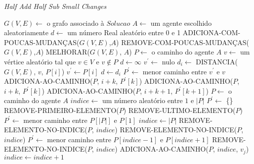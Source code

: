 \begin{algorithm}                   %
	\caption{\textit{Half Add Half Sub Small Changes}}          %
	\label{small_changes}                           %
	\begin{algorithmic}[1]                   %
		\newline
		\State $G(V,E) \gets $ o grafo associado à $Solucao$
		\State $A \gets $ um agente escolhido aleatoriamente
		\State $d \gets $ um número Real aleatório entre 0 e 1
			\State ADICIONA-COM-POUCAS-MUDANÇAS($G(V,E)$,$A$)
		\Else
			\State REMOVE-COM-POUCAS-MUDANÇAS($G(V,E)$,$A$)
		\EndIf
		\State MELHORAR($G(V,E)$, $A$)
		\EndProcedure
		\State $P \gets $ o caminho do agente $A$
		\State $v \gets $ um vértice aleatório tal que $v \in V$ e $v \notin P$
		\State $d \gets \infty$
		\State $v^{\prime} \gets $ nulo
			$d_{i} \gets $ DISTANCIA($G(V,E)$, $v$, $P[i]$)
				$v^{\prime} \gets P[i]$
				\State $d \gets d_{i}$
			\EndIf
		\EndFor
		\State $P^{\prime} \gets $ menor caminho entre $v^{\prime}$ e $v$
			ADICIONA-AO-CAMINHO($P$, $i + k$, $P^{\prime}[k]$)
			\State ADICIONA-AO-CAMINHO($P$, $i + k$, $P^{\prime}[k]$)
		\EndFor
		\State ADICIONA-AO-CAMINHO($P$, $i + k + 1$, $P^{\prime}[k + 1]$)
		\EndProcedure
		\State $P \gets $ o caminho do agente $A$
		\State $indice \gets $ um número aleatório entre $1$ e $|P|$
		\State $P^{\prime} \gets $ \{\}
			REMOVE-PRIMEIRO-ELEMENTO($P$)
			\State REMOVE-ULTIMO-ELEMENTO($P$)
			\State $P^{\prime} \gets $ menor caminho entre $P[|P|]$ e $P[1]$
			\State $indice \gets |P|$
			\State REMOVE-ELEMENTO-NO-INDICE($P$, $indice$)
			\State REMOVE-ELEMENTO-NO-INDICE($P$, $indice$)
		\Else
			$P^{\prime} \gets $ menor caminho entre $P[indice - 1]$ e $P[indice + 1]$
			\State REMOVE-ELEMENTO-NO-INDICE($P$, $indice$)
		\EndIf
			ADICIONA-AO-CAMINHO($P$, $indice$, $v_{j}$)
			\State $indice \gets indice + 1$
		\EndFor
		\EndProcedure
	\end{algorithmic}
\end{algorithm}

